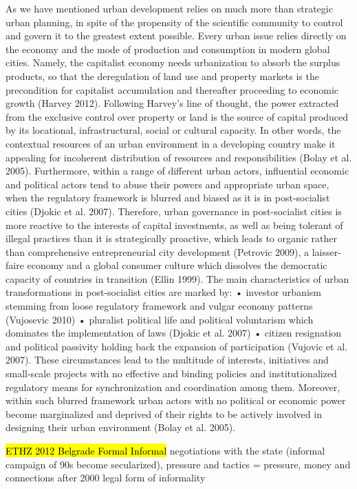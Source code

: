 \documentclass[11pt]{report}
\begin{document}
As we have mentioned urban development relies on much more than strategic urban planning, in spite of the propensity of the scientific community to control and govern it to the greatest extent possible. Every urban issue relies directly on the economy and the mode of production and consumption in modern global cities. Namely, the capitalist economy needs urbanization to absorb the surplus products, so that the deregulation of land use and property markets is the precondition for capitalist accumulation and thereafter proceeding to economic growth (Harvey 2012). Following Harvey’s line of thought, the power extracted from the exclusive control over property or land is the source of capital produced by its locational, infrastructural, social or cultural capacity. In other words, the contextual resources of an urban environment in a developing country make it appealing for incoherent distribution of resources and responsibilities (Bolay et al. 2005). Furthermore, within a range of different urban actors, influential economic and political actors tend to abuse their powers and appropriate urban space, when the regulatory framework is blurred and biased as it is in post-socialist cities (Djokic et al. 2007). 
Therefore, urban governance in post-socialist cities is more reactive to the interests of capital investments, as well as being tolerant of illegal practices than it is strategically proactive, which leads to organic rather than comprehensive entrepreneurial city development (Petrovic 2009), a laisser-faire economy and a global consumer culture which dissolves the democratic capacity of countries in transition (Ellin 1999). The main characteristics of urban transformations in post-socialist cities are marked by:
•	investor urbanism stemming from loose regulatory framework and vulgar economy patterns (Vujosevic 2010)
•	pluralist political life and political voluntarism which dominates the implementation of laws (Djokic et al. 2007)
•	citizen resignation and political passivity holding back the expansion of participation (Vujovic et al. 2007).
These circumstances lead to the multitude of interests, initiatives and small-scale projects with no effective and binding policies and institutionalized regulatory means for synchronization and coordination among them. Moreover, within such blurred framework urban actors with no political or economic power become marginalized and deprived of their rights to be actively involved in designing their urban environment (Bolay et al. 2005).

\hl{ETHZ 2012 Belgrade Formal Informal}
negotiations with the state (informal campaign of 90s become secularized), pressure and tactics = pressure, money and connections
after 2000 legal form of informality
\end{document}
